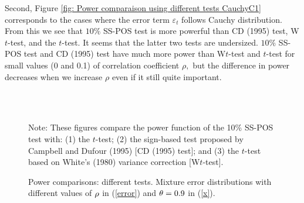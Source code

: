 \documentclass[harvard,11pt]{article}
\begin{document}
Second, Figure \ref{fig: Power comparaison using different tests CauchyC1}
corresponds to the cases where the error term $\varepsilon _{t}$ follows
Cauchy distribution. From this we see that $10\%$ SS-POS test is more
powerful than CD (1995) test, W$t$-test, and the $t$-test. It seems that the latter two
tests are undersized. $10\%$ SS-POS test and CD (1995) test have much more power
than W$t$-test and $t$-test for small values (0 and 0.1) of correlation
coefficient $\rho ,$ but the difference in power decreases when we increase $%
\rho $ even if it still quite important. 
\begin{figure}[tbph]
\caption{Power comparisons: different tests. Mixture error distributions
with different values of $\protect\rho $ in (\protect\ref{error}) and $%
\protect\theta =0.9$ in (\protect\ref{x}).}
\begin{center}
 \\[0pt]
\\[0pt]
\end{center}

Note: These figures compare the power
function of the 10\% SS-POS test with: (1) the $t$-test; (2) the sign-based test
proposed by Campbell and Dufour (1995) [CD (1995) test]; and (3) the $t$-test based
on White's (1980) variance correction [W$t$-test]. 
\label{fig: Power comparaison using different tests MixtureC1}
\end{figure}
\end{document}
